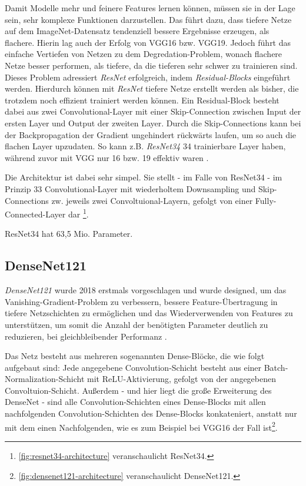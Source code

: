 Damit Modelle mehr und feinere Features lernen können, müssen sie in der Lage sein, sehr komplexe Funktionen darzustellen. 
Das führt dazu, dass tiefere Netze auf dem ImageNet-Datensatz tendenziell bessere Ergebnisse erzeugen, als flachere. 
Hierin lag auch der Erfolg von VGG16 bzw. VGG19. Jedoch führt das einfache Vertiefen von Netzen zu dem Degredation-Problem, wonach 
flachere Netze besser performen, als tiefere, da die tieferen sehr schwer zu trainieren sind. \\
Dieses Problem adressiert \textit{ResNet} erfolgreich, indem \textit{Residual-Blocks} eingeführt werden. 
Hierdurch können mit \textit{ResNet} tiefere Netze erstellt werden als bisher, die trotzdem noch effizient trainiert werden können.
Ein Residual-Block besteht dabei aus zwei Convolutional-Layer mit einer Skip-Connection zwischen Input der ersten Layer und Output 
der zweiten Layer. Durch die Skip-Connections kann bei der Backpropagation der Gradient ungehindert rückwärts laufen, 
um so auch die flachen Layer upzudaten. So kann z.B. \textit{ResNet34} 34 trainierbare Layer haben, 
während zuvor mit VGG nur 16 bzw. 19 effektiv waren \cite{He.10122015}. 

Die Architektur ist dabei sehr simpel. Sie stellt - im Falle von ResNet34 - im Prinzip 33 Convolutional-Layer mit wiederholtem Downsampling 
und Skip-Connections zw. jeweils zwei Convoltuional-Layern, gefolgt von einer Fully-Connected-Layer dar \cite{He.10122015}\footnote{\autoref{fig:resnet34-architecture} veranschaulicht ResNet34.}.

ResNet34 hat 63,5 Mio. Parameter. 


\subsection{DenseNet121} \label{sec:pretrained-backbones:densenet121}

\textit{DenseNet121} wurde 2018 erstmals vorgeschlagen und wurde designed, um das Vanishing-Gradient-Problem 
zu verbessern, bessere Feature-Übertragung in tiefere Netzschichten zu ermöglichen und das Wiederverwenden von Features 
zu unterstützen, um somit die Anzahl der benötigten Parameter deutlich zu reduzieren, bei gleichbleibender Performanz \cite{Huang.25082016}.

Das Netz besteht aus mehreren sogenannten Dense-Blöcke, die wie folgt aufgebaut sind: 
Jede angegebene Convolution-Schicht besteht aus einer Batch-Normalization-Schicht mit \ac{ReLU}-Aktivierung,
gefolgt von der angegebenen Convoltuion-Schicht. Außerdem - und hier liegt die große Erweiterung des DenseNet - sind alle 
Convolution-Schichten eines Dense-Blocks mit allen nachfolgenden Convolution-Schichten des Dense-Blocks konkateniert,
anstatt nur mit dem einen Nachfolgenden, wie es zum Beispiel bei VGG16 der Fall ist\footnote{\autoref{fig:densenet121-architecture} veranschaulicht DenseNet121.}. 

